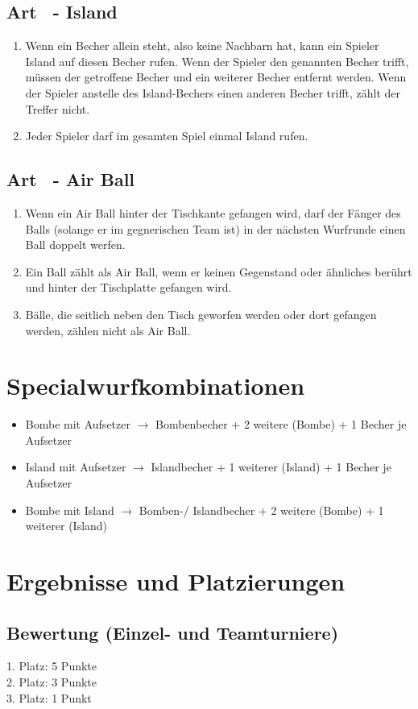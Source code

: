 \documentclass[a4paper,11pt]{scrartcl}
\newcommand{\enum}[1]{\begin{enumerate}[label=(\arabic*)]#1\end{enumerate}}
\newcommand{\art}[2]{\subsection*{#1} \enum{#2}}
\newcommand{\quot}[1]{\glqq #1\grqq}
\newcounter{art}
\begin{document}
    \art{Art \theart\ - \quot{Island}}{
        \item
            Wenn ein Becher allein steht, also keine Nachbarn hat, kann ein Spieler \quot{Island} auf diesen Becher rufen. Wenn der Spieler den genannten Becher trifft, müssen der getroffene Becher und ein weiterer Becher entfernt werden. Wenn der Spieler anstelle des \quot{Island}-Bechers einen anderen Becher trifft, zählt der Treffer nicht.
        \item
            Jeder Spieler darf im gesamten Spiel einmal \quot{Island} rufen.
    }

    \art{Art \theart\ - \quot{Air Ball}}{
        \item
            Wenn ein \quot{Air Ball} hinter der Tischkante gefangen wird, darf der Fänger des Balls (solange er im gegnerischen Team ist) in der nächsten Wurfrunde einen Ball doppelt werfen.
        \item
            Ein Ball zählt als \quot{Air Ball}, wenn er keinen Gegenstand oder ähnliches berührt und hinter der Tischplatte gefangen wird.
        \item
            Bälle, die seitlich neben den Tisch geworfen werden oder dort gefangen werden, zählen nicht als \quot{Air Ball}.
    }

\section{Specialwurfkombinationen}
    \begin{itemize}
        \item
            Bombe mit Aufsetzer $\rightarrow$ Bombenbecher + 2 weitere (Bombe) + 1 Becher je Aufsetzer
        \item
            Island mit Aufsetzer $\rightarrow$ Islandbecher + 1 weiterer (Island) + 1 Becher je Aufsetzer
        \item
            Bombe mit Island $\rightarrow$ Bomben-/ Islandbecher + 2 weitere (Bombe) + 1 weiterer (Island)
    \end{itemize}

\newpage

\section{Ergebnisse und Platzierungen}
    \subsection{Bewertung (Einzel- und Teamturniere)}
    1. Platz: 5 Punkte\\
    2. Platz: 3 Punkte\\
    3. Platz: 1 Punkt
\end{document}
